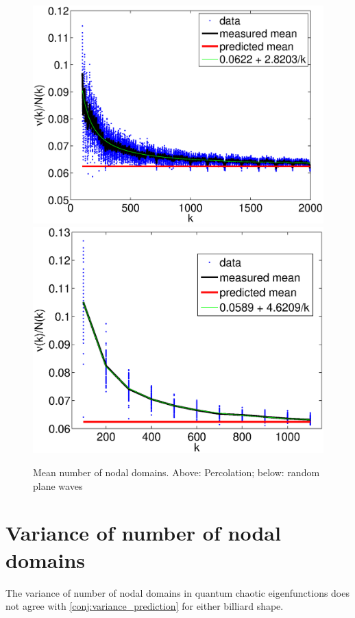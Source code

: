 \documentclass{report}
\begin{document}
\begin{figure}
  \begin{center}
    \includegraphics[width=\textwidth]{figs/results/perc_100_to_2000_mean.eps}
    \includegraphics[width=\textwidth]{figs/results/rpw_all_mean.eps}
    \caption{Mean number of nodal domains. Above: Percolation; below: random plane waves}
  \end{center}
\end{figure}

\section{Variance of number of nodal domains}
The variance of number of nodal domains in quantum chaotic eigenfunctions does not agree with \ref{conj:variance_prediction} for either billiard shape.
\end{document}
